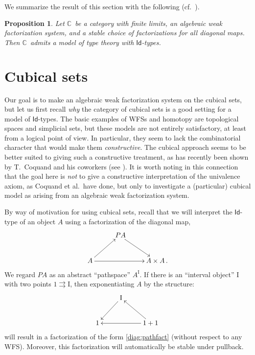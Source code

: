 \documentclass[12pt]{article}
\newcommand{\C}{\ensuremath{\mathbb{C}}}
\newcommand{\I}{\ensuremath{\mathrm{I}}}
\newcommand{\Id}{\ensuremath{\mathsf{Id}}}
\newtheorem{proposition}[theorem]{Proposition}
\theoremstyle{remark}
\theoremstyle{definition}
\begin{document}
We summarize the result of this section with the following (cf.~\cite{GvdB}).

\begin{proposition}
Let \C\ be a category with finite limits, an algebraic weak factorization system, and a stable choice of factorizations for all diagonal maps.  Then \C\ admits a model of type theory with \Id-types.
\end{proposition}

\section{Cubical sets}

Our goal is to make an algebraic weak factorization system on the cubical sets, but let us first recall \emph{why} the category of cubical sets is a good setting for a model of \Id-types.  The basic examples of WFSs and homotopy are topological spaces and simplicial sets, but these models are not entirely satisfactory, at least from a logical point of view.  In particular, they seem to lack the combinatorial character that would make them \emph{constructive}.  The cubical approach seems to be better suited to giving such a constructive treatment, as has recently been shown by T.~Coquand and his coworkers (see \cite{BCH}).  It is worth noting in this connection that the goal here is \emph{not} to give a constructive interpretation of the univalence axiom, as Coquand et al.\ have done, but only to investigate a (particular) cubical model as arising from an algebraic weak factorization system.

By way of motivation for using cubical sets, recall that we will interpret the \Id-type of an object $A$ using a factorization of the diagonal map,
\begin{equation}\label{diag:pathfact}
\xymatrix{
& \ PA \ar[rd] & \\
A \ar[rr] \ar[ru] && A\times A\,.
}
\end{equation}
We regard $PA$ as an abstract  ``pathspace'' $A^\I$.  If there is an ``interval object'' $\I$ with two points $1\rightrightarrows\I$, then exponentiating $A$ by the structure:
\[
\xymatrix{
& \ar[ld] \I  & \\
1 && \ar[ll] \ar[ul] 1+1\,
}
\]
will result in a factorization of the form \eqref{diag:pathfact} (without respect to any WFS).  Moreover, this factorization will automatically be stable under pullback.
\end{document}
